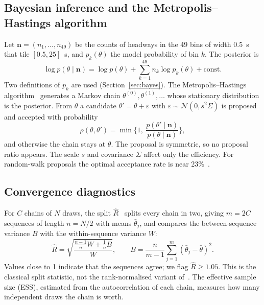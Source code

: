 \documentclass[11pt,a4paper]{article}
\numberwithin{equation}{section}
\begin{document}
\subsection{Bayesian inference and the Metropolis--Hastings algorithm}
Let $\mathbf n=(n_1,\dots,n_{49})$ be the counts of headways in the 49 bins of width 0.5~s that tile $[0.5,25]$~s, and
$p_k(\theta)$ the model probability of bin $k$. The posterior is
\begin{equation}\label{eq:posterior}
\log p(\theta\mid\mathbf n)=\log p(\theta)+\sum_{k=1}^{49}n_k\log p_k(\theta)+\text{const.}
\end{equation}
Two definitions of $p_k$ are used (Section~\ref{sec:bayes}). The Metropolis--Hastings algorithm~\cite{metropolis1953,hastings1970} generates a Markov chain $\theta^{(0)},\theta^{(1)},\dots$ whose
stationary distribution is the posterior. From $\theta$ a candidate $\theta'=\theta+\varepsilon$ with $\varepsilon\sim\mathcal
N(0,s^2\Sigma)$ is proposed and accepted with probability
\begin{equation}\label{eq:accept}
\rho(\theta,\theta')=\min\Big\{1,\ \frac{p(\theta'\mid\mathbf n)}{p(\theta\mid\mathbf n)}\Big\},
\end{equation}
and otherwise the chain stays at $\theta$. The proposal is symmetric, so no proposal ratio appears. The scale $s$ and covariance $\Sigma$ affect only the efficiency. For
random-walk proposals the optimal acceptance rate is near 23\%~\cite{roberts1997}.

\subsection{Convergence diagnostics}
For $C$ chains of $N$ draws, the split $\hat R$~\cite{gelman1992,gelman2013,vehtari2021} splits every chain in two, giving $m=2C$ sequences of
length $n=N/2$ with means $\bar\theta_j$, and compares the between-sequence variance $B$ with the within-sequence variance
$W$:
\begin{equation}\label{eq:rhat}
\hat R=\sqrt{\frac{\tfrac{n-1}{n}W+\tfrac1nB}{W}},\qquad
B=\frac{n}{m-1}\sum_{j=1}^{m}(\bar\theta_j-\bar\theta)^2 .
\end{equation}
Values close to 1 indicate that the sequences agree; we flag $\hat R\ge1.05$. This is the classical split statistic, not the rank-normalised variant of~\cite{vehtari2021}. The effective sample size (ESS), estimated from
the autocorrelation of each chain, measures how many independent draws the chain is worth.
\end{document}
